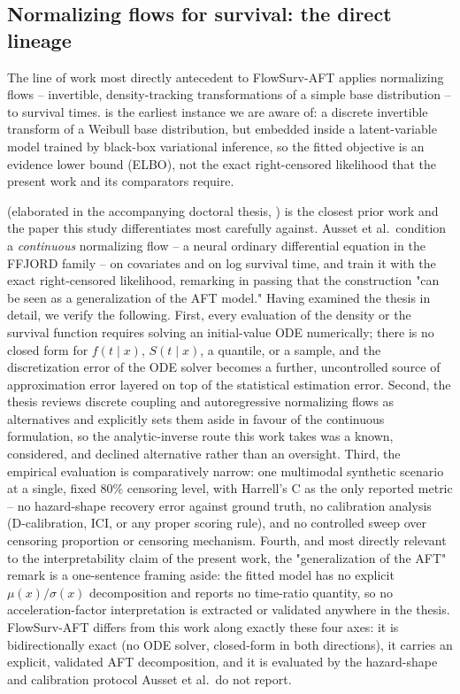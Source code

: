 \documentclass[11pt]{article}
\begin{document}
\subsection{Normalizing flows for survival: the direct lineage}
\label{sec:flows}
The line of work most directly antecedent to FlowSurv-AFT applies
normalizing flows -- invertible, density-tracking transformations of a
simple base distribution -- to survival times. \citet{miscouridou2018} is
the earliest instance we are aware of: a discrete invertible transform of
a Weibull base distribution, but embedded inside a latent-variable model
trained by black-box variational inference, so the fitted objective is an
evidence lower bound (ELBO), not the exact right-censored likelihood that
the present work and its comparators require.

\citet{ausset2021flows} (elaborated in the accompanying doctoral thesis,
\citealp{ausset2021thesis}) is the closest prior work and the paper this
study differentiates most carefully against. Ausset et al.\ condition a
\emph{continuous} normalizing flow -- a neural ordinary differential
equation in the FFJORD family -- on covariates and on log survival time,
and train it with the exact right-censored likelihood, remarking in
passing that the construction "can be seen as a generalization of the AFT
model." Having examined the thesis in detail, we verify the following.
First, every evaluation of the density or the survival function requires
solving an initial-value ODE numerically; there is no closed form for
$f(t\mid x)$, $S(t\mid x)$, a quantile, or a sample, and the discretization
error of the ODE solver becomes a further, uncontrolled source of
approximation error layered on top of the statistical estimation error.
Second, the thesis reviews discrete coupling and autoregressive
normalizing flows as alternatives and explicitly sets them aside in favour
of the continuous formulation, so the analytic-inverse route this work
takes was a known, considered, and declined alternative rather than an
oversight. Third, the empirical evaluation is comparatively narrow: one
multimodal synthetic scenario at a single, fixed 80\% censoring level, with
Harrell's C as the only reported metric -- no hazard-shape recovery
error against ground truth, no calibration analysis (D-calibration, ICI,
or any proper scoring rule), and no controlled sweep over censoring
proportion or censoring mechanism. Fourth, and most directly relevant to
the interpretability claim of the present work, the "generalization of
the AFT" remark is a one-sentence framing aside: the fitted model has no
explicit $\mu(x)/\sigma(x)$ decomposition and reports no time-ratio
quantity, so no acceleration-factor interpretation is extracted or
validated anywhere in the thesis. FlowSurv-AFT differs from this work
along exactly these four axes: it is bidirectionally exact (no ODE
solver, closed-form in both directions), it carries an explicit,
validated AFT decomposition, and it is evaluated by the hazard-shape and
calibration protocol Ausset et al.\ do not report.
\end{document}
